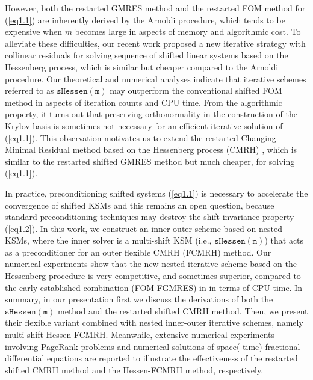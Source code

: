 \documentclass{report}
\begin{document}
However, both the restarted GMRES method and the restarted FOM method for
(\ref{eq1.1}) are inherently derived by the Arnoldi procedure, which
tends to be expensive when $m$ becomes large in aspects of memory and
algorithmic cost. To alleviate these difficulties, our recent work
\cite{XMGTZH} proposed a new iterative strategy with collinear residuals
for solving sequence of shifted linear systems based on the Hessenberg
process, which is similar but cheaper compared to the Arnoldi procedure.
Our theoretical and numerical analyses indicate that iterative schemes
referred to as $\mathtt{sHessen(m)}$ may outperform the conventional
shifted FOM method in aspects of iteration counts and CPU time. From the
algorithmic property, it turns out that preserving orthonormality
in the construction of the Krylov basis is sometimes not necessary for an
efficient iterative solution of (\ref{eq1.1}). This observation motivates
us to extend the restarted Changing Minimal Residual method based on the
Hessenberg process (CMRH) \cite{HSCMRH}, which is similar
to the restarted shifted GMRES method but much cheaper, for solving (\ref{eq1.1}).

In practice, preconditioning shifted systems (\ref{eq1.1}) is necessary
to accelerate the convergence of shifted KSMs and this remains an open
question, because standard preconditioning techniques may destroy the
shift-invariance property (\ref{eq1.2}). In this work, we construct an
inner-outer scheme based on nested KSMs, where the inner solver is a
multi-shift KSM (i.e., $\mathtt{sHessen(m)}$) that acts as a
preconditioner for an outer flexible CMRH (FCMRH) method. Our
numerical experiments show that the new nested iterative scheme based on
the Hessenberg procedure is very competitive, and sometimes superior,
compared to the early established combination (FOM-FGMRES) in
\cite{MBMBG} in terms of CPU time. In summary, in our presentation first
we discuss the derivations of both the $\mathtt{sHessen(m)}$ method
\cite{XMGTZH} and the restarted shifted CMRH method. Then, we present
their flexible variant combined with nested inner-outer iterative
schemes, namely multi-shift Hessen-FCMRH.
Meanwhile, extensive numerical experiments involving PageRank problems
and numerical solutions of space(-time) fractional differential equations
are reported to illustrate the effectiveness of the restarted shifted
CMRH method and the Hessen-FCMRH method, respectively.
\end{document}
